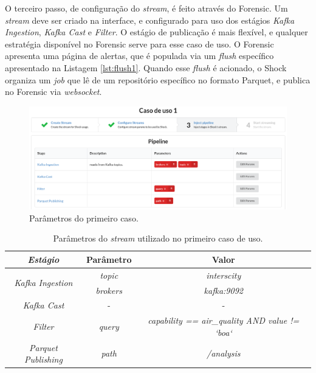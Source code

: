 O terceiro passo, de configuração do \textit{stream}, é feito através do Forensic.
Um \textit{stream} deve ser criado na interface, e configurado para uso dos
estágios \textit{Kafka Ingestion}, \textit{Kafka Cast} e \textit{Filter}.
O estágio de publicação é mais flexível, e qualquer
estratégia disponível no Forensic serve para esse caso de uso. O Forensic
apresenta uma página de alertas, que é populada via um \textit{flush}
específico apresentado na Listagem \ref{lst:flush1}. Quando esse
\textit{flush} é acionado, o Shock organiza um \textit{job}
que lê de um repositório específico no formato Parquet, e publica no Forensic
via \textit{websocket}.

\begin{figure}[hbt]
  \centering
  \includegraphics[width=\textwidth]{figuras/parametros.png}
  \caption{Parâmetros do primeiro caso.}
  \label{fig:case1}
\end{figure}

\begin{table}[hbt]
    \centering
    \caption{Parâmetros do \textit{stream} utilizado no primeiro caso de uso.}
    \label{tab:case1}
    \begin{tabular}{|c|c|c|}
        \hline
        \textit{\textbf{Estágio}}                   & \textbf{Parâmetro} & \textbf{Valor}                                         \\ \hline
        \multirow{2}{*}{\textit{Kafka Ingestion}} & \textit{topic}     & \textit{interscity}                                    \\ \cline{2-3} 
                                                  & \textit{brokers}   & \textit{kafka:9092}                                    \\ \hline
                                                  \textit{Kafka Cast}                       & -                  & -                                                      \\ \hline
                                                  \textit{Filter}                           & \textit{query}     & \textit{capability == air\_quality AND value != `boa`} \\ \hline
                                                  \textit{Parquet Publishing}               & \textit{path}      & \textit{/analysis}                                     \\ \hline
    \end{tabular}
\end{table}

